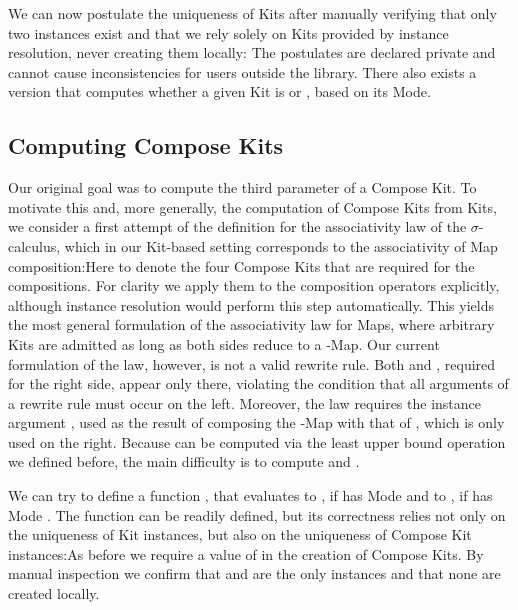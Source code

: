 \documentclass[screen,nonacm]{acmart}
\begin{document}
We can now postulate the uniqueness of Kits after manually verifying that only
two instances exist and that we rely solely on Kits provided by instance
resolution, never creating them locally: \AUniqueKits{}The postulates are
declared private and cannot cause inconsistencies for users outside the
library. There also exists a version  that computes
whether a given Kit is  or , based on its Mode.

\subsection{Computing Compose Kits}\label{sec:ags-cck}
Our original goal was to compute the third parameter of a Compose Kit. To
motivate this and, more generally, the computation of Compose Kits from Kits,
we consider a first attempt of the definition for the associativity law of the
$σ$-calculus, which in our Kit-based setting corresponds to the associativity
of Map composition:\AAssocTryO{}Here  to  denote
the four Compose Kits that are required for the compositions. For clarity we
apply them to the composition operators explicitly, although instance
resolution would perform this step automatically. This yields the most general
formulation of the associativity law for Maps, where arbitrary Kits are
admitted as long as both sides reduce to a -Map. Our current
formulation of the law, however, is not a valid rewrite rule. Both
 and , required for the right side, appear only
there, violating the condition that all arguments of a rewrite rule must occur
on the left. Moreover, the law requires the instance argument ,
used as the result of composing the -Map with that of
, which is only used on the right. Because  can be
computed via the least upper bound operation we defined before, the main
difficulty is to compute  and .

We can try to define a function \ACompCKitSafe{}, that evaluates to
, if  has Mode  and
to , if  has Mode .
The function can be readily defined, but its correctness relies not only on the
uniqueness of Kit instances, but also on the uniqueness of Compose Kit
instances:\AUniqueCKits{}As before we require a value of  in
the creation of Compose Kits. By manual inspection we confirm that
 and  are the only instances and that none
are created locally.
\end{document}
